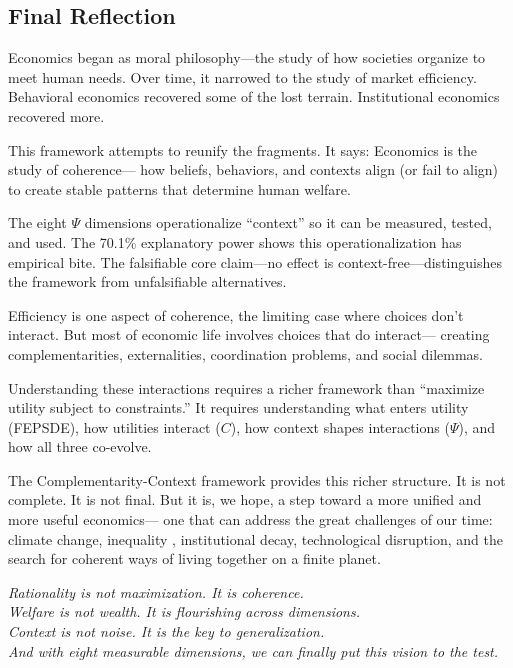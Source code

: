 \documentclass[12pt,a4paper]{article}
\begin{document}
\subsection{Final Reflection}

Economics began as moral philosophy---the study of how societies organize
to meet human needs. Over time, it narrowed to the study of market efficiency.
Behavioral economics recovered some of the lost terrain.
Institutional economics recovered more.

This framework attempts to reunify the fragments.
It says: Economics is the study of coherence---
how beliefs, behaviors, and contexts align (or fail to align)
to create stable patterns that determine human welfare.

The eight $\Psi$ dimensions operationalize ``context'' so it can be measured, tested, and used.
The 70.1\% explanatory power shows this operationalization has empirical bite.
The falsifiable core claim---no effect is context-free---distinguishes the framework from unfalsifiable alternatives.

Efficiency is one aspect of coherence, the limiting case where choices don't interact.
But most of economic life involves choices that do interact---
creating complementarities, externalities, coordination problems, and social dilemmas.

Understanding these interactions requires a richer framework than
``maximize utility subject to constraints.''
It requires understanding what enters utility (FEPSDE),
how utilities interact ($C$), how context shapes interactions ($\Psi$),
and how all three co-evolve.

The Complementarity-Context framework provides this richer structure.
It is not complete. It is not final. But it is, we hope, a step toward
a more unified and more useful economics---
one that can address the great challenges of our time:
climate change, inequality \citep{piketty2014}, institutional decay, technological disruption,
and the search for coherent ways of living together on a finite planet.

\vspace{1em}
\begin{center}
\emph{Rationality is not maximization. It is coherence.} \\
\emph{Welfare is not wealth. It is flourishing across dimensions.} \\
\emph{Context is not noise. It is the key to generalization.} \\[0.5em]
\emph{And with eight measurable dimensions, we can finally put this vision to the test.}
\end{center}
\end{document}
